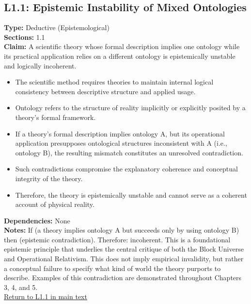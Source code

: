 \documentclass[12pt]{book}
\newcommand{\returnlink}[1]{\hyperref[logic:#1]{Return to #1 in main text}\xspace}
\begin{document}
\subsection*{L1.1: Epistemic Instability of Mixed Ontologies}
\label{appendix:L1.1}
\textbf{Type:} Deductive (Epistemological) \\
\textbf{Sections:} 1.1 \\
\textbf{Claim:} A scientific theory whose formal description implies one ontology while its practical application relies on a different ontology is epistemically unstable and logically incoherent.
\begin{itemize}
  \item The scientific method requires theories to maintain internal logical consistency between descriptive structure and applied usage.
  \item Ontology refers to the structure of reality implicitly or explicitly posited by a theory's formal framework.
  \item If a theory's formal description implies ontology A, but its operational application presupposes ontological structures inconsistent with A (i.e., ontology B), the resulting mismatch constitutes an unresolved contradiction.
  \item Such contradictions compromise the explanatory coherence and conceptual integrity of the theory.
  \item Therefore, the theory is epistemically unstable and cannot serve as a coherent account of physical reality.
\end{itemize}
\textbf{Dependencies:} None \\
\textbf{Notes:} If (a theory implies ontology A but succeeds only by using ontology B) then (epistemic contradiction). Therefore: incoherent. This is a foundational epistemic principle that underlies the central critique of both the Block Universe and Operational Relativism. This does not imply empirical invalidity, but rather a conceptual failure to specify what kind of world the theory purports to describe. Examples of this contradiction are demonstrated throughout Chapters 3, 4, and 5.\\
\returnlink{L1.1}
\end{document}
